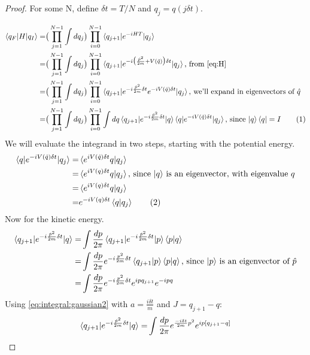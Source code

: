 \documentclass[]{article}
\newcommand\numberthis{\addtocounter{equation}{1}\tag{\theequation}}
\begin{document}
\begin{proof}
	For some N, define $\delta t =T/N$ and $q_j= q(j \delta t)$.
	
	\begin{align*}
		\braket{q_F\vert H\vert q_I} =& \big(\prod_{j=1}^{N-1} \int dq_j\big)\prod_{i=0}^{N-1} \braket{q_{j+1} \vert e^{-iHT} \vert q_j}\\
		=& \big(\prod_{j=1}^{N-1} \int dq_j\big)\prod_{i=0}^{N-1} \braket{q_{j+1} \vert e^{-i\big(\frac{\hat{p}^2}{2m} + V(\hat{q})\big)\delta t} \vert q_j} \text{, from \eqref{eq:H}}\\
		=& \big(\prod_{j=1}^{N-1} \int dq_j\big)\prod_{i=0}^{N-1} \braket{q_{j+1} \vert e^{-i\frac{\hat{p}^2}{2m} \delta t} e^{-i V(\hat{q}) \delta t} \vert q_j} \text{, we'll expand in eigenvectors of $\hat{q}$}\\
		=& \big(\prod_{j=1}^{N-1} \int dq_j\big)\prod_{i=0}^{N-1} \int dq \braket{q_{j+1} \vert e^{-i\frac{\hat{p}^2}{2m} \delta t}\vert q} \braket{q\vert e^{-i V(\hat{q}) \delta t} \vert q_j} \text{, since $\ket{q}\bra{q}=I$} \numberthis \label{eq:qHq}
	\end{align*}
	 We will evaluate the integrand in two steps, starting with the potential energy.
	\begin{align*}
		\braket{q\vert e^{-i V(\hat{q}) \delta t} \vert q_j} =& \braket{ e^{i V(\hat{q}) \delta t} q \vert q_j}\\
		=& \braket{ e^{i V(q) \delta t} q \vert q_j} \text{, since $\ket{q}$ is an eigenvector, with eigenvalue $q$}\\
		=& \braket{ e^{i V(q) \delta t} q \vert q_j} \\
		=& e^{-i V(q) \delta t} \braket{ q \vert q_j}  \numberthis \label{eq:qVq}
	\end{align*}
	Now for the kinetic energy.
	\begin{align*}
		\braket{q_{j+1} \vert e^{-i\frac{\hat{p}^2}{2m} \delta t}  \vert q}=& \int \frac{dp}{2\pi}\braket{q_{j+1} \vert e^{-i\frac{\hat{p}^2}{2m} \delta t}  \vert p} \braket{p\vert q}\\
		=& \int \frac{dp}{2\pi} e^{-i\frac{p^2}{2m} \delta t} \braket{q_{j+1} \vert p} \braket{p\vert q} \text{, since $\ket{p}$ is an eigenvector of $\hat{p}$}\\
		=& \int \frac{dp}{2\pi} e^{-i\frac{p^2}{2m} \delta t} e^{ip q_{j+1}} e^{-ip q} 
	\end{align*}
	Using \eqref{eq:integral:gaussian2} with $a=\frac{i \delta t}{m}$ and $J=q_{j+1}-q$:
	\begin{align*}
	\braket{q_{j+1} \vert e^{-i\frac{\hat{p}^2}{2m} \delta t}  \vert q}=& \int \frac{dp}{2\pi} e^{\frac{-i \delta t}{2m}p^2} e^{ip [q_{j+1}-q]} \\

\end{align*}
\end{proof}
\end{document}
